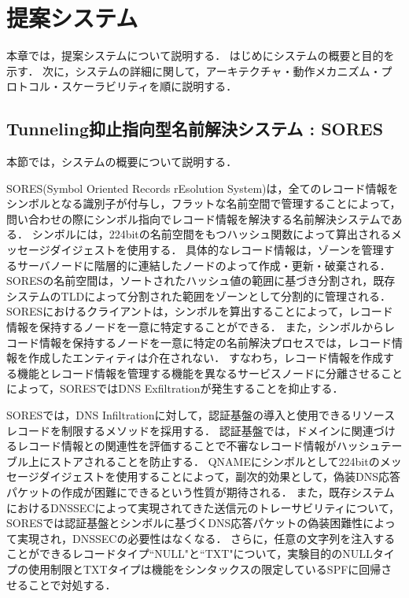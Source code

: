 \section{提案システム}
本章では，提案システムについて説明する．
はじめにシステムの概要と目的を示す．
次に，システムの詳細に関して，アーキテクチャ・動作メカニズム・プロトコル・スケーラビリティを順に説明する．

\subsection{Tunneling抑止指向型名前解決システム : SORES}
本節では，システムの概要について説明する．

SORES(Symbol Oriented Records rEsolution System)は，全てのレコード情報をシンボルとなる識別子が付与し，フラットな名前空間で管理することによって，問い合わせの際にシンボル指向でレコード情報を解決する名前解決システムである．
シンボルには，224bitの名前空間をもつハッシュ関数によって算出されるメッセージダイジェストを使用する．
具体的なレコード情報は，ゾーンを管理するサーバノードに階層的に連結したノードのよって作成・更新・破棄される．
SORESの名前空間は，ソートされたハッシュ値の範囲に基づき分割され，既存システムのTLDによって分割された範囲をゾーンとして分割的に管理される．
SORESにおけるクライアントは，シンボルを算出することによって，レコード情報を保持するノードを一意に特定することができる．
また，シンボルからレコード情報を保持するノードを一意に特定の名前解決プロセスでは，レコード情報を作成したエンティティは介在されない．
すなわち，レコード情報を作成する機能とレコード情報を管理する機能を異なるサービスノードに分離させることによって，SORESではDNS Exfiltrationが発生することを抑止する．

SORESでは，DNS Infiltrationに対して，認証基盤の導入と使用できるリソースレコードを制限するメソッドを採用する．
認証基盤では，ドメインに関連づけるレコード情報との関連性を評価することで不審なレコード情報がハッシュテーブル上にストアされることを防止する．
QNAMEにシンボルとして224bitのメッセージダイジェストを使用することによって，副次的効果として，偽装DNS応答パケットの作成が困難にできるという性質が期待される．
また，既存システムにおけるDNSSECによって実現されてきた送信元のトレーサビリティについて，SORESでは認証基盤とシンボルに基づくDNS応答パケットの偽装困難性によって実現され，DNSSECの必要性はなくなる．
さらに，任意の文字列を注入することができるレコードタイプ``NULL"と``TXT"について，実験目的のNULLタイプの使用制限とTXTタイプは機能をシンタックスの限定しているSPFに回帰させることで対処する．

